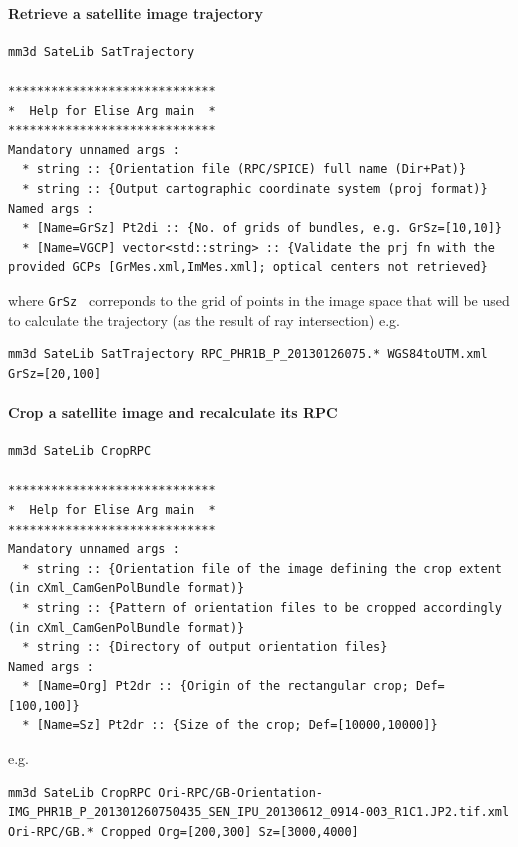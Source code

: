 \paragraph*{Retrieve a satellite image trajectory}
%
\vspace{0.5cm}
%
\begin{verbatim}
mm3d SateLib SatTrajectory

*****************************
*  Help for Elise Arg main  *
*****************************
Mandatory unnamed args : 
  * string :: {Orientation file (RPC/SPICE) full name (Dir+Pat)}
  * string :: {Output cartographic coordinate system (proj format)}
Named args : 
  * [Name=GrSz] Pt2di :: {No. of grids of bundles, e.g. GrSz=[10,10]}
  * [Name=VGCP] vector<std::string> :: {Validate the prj fn with the provided GCPs [GrMes.xml,ImMes.xml]; optical centers not retrieved}
\end{verbatim}
where {\tt GrSz } correponds to the grid of points in the image space that will be used to calculate the trajectory (as the result of ray intersection)
e.g. 
\begin{verbatim}
mm3d SateLib SatTrajectory RPC_PHR1B_P_20130126075.* WGS84toUTM.xml  GrSz=[20,100]
\end{verbatim}

\paragraph*{Crop a satellite image and recalculate its RPC}
 

\begin{verbatim}
mm3d SateLib CropRPC

*****************************
*  Help for Elise Arg main  *
*****************************
Mandatory unnamed args : 
  * string :: {Orientation file of the image defining the crop extent (in cXml_CamGenPolBundle format)}
  * string :: {Pattern of orientation files to be cropped accordingly (in cXml_CamGenPolBundle format)}
  * string :: {Directory of output orientation files}
Named args : 
  * [Name=Org] Pt2dr :: {Origin of the rectangular crop; Def=[100,100]}
  * [Name=Sz] Pt2dr :: {Size of the crop; Def=[10000,10000]}
\end{verbatim}

e.g.
\begin{verbatim}
mm3d SateLib CropRPC Ori-RPC/GB-Orientation-IMG_PHR1B_P_201301260750435_SEN_IPU_20130612_0914-003_R1C1.JP2.tif.xml Ori-RPC/GB.* Cropped Org=[200,300] Sz=[3000,4000]
\end{verbatim}



